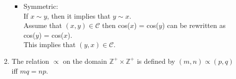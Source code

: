 \documentclass{article}
\newcommand{\Z}{\mathbb{Z}}
\begin{document}
\begin{enumerate}
\begin{enumerate}
\begin{itemize}
        \item Symmetric:\\If $x \sim y$, then it implies that $y \sim x$.\\Assume that $(x,y) \in 
        \mathcal{C}$ then cos($x$) = cos($y$) can be rewritten as cos($y$) = cos($x$).\\This implies 
        that $(y,x) \in \mathcal{C}$. 

        
    \end{itemize}
    \item The relation $\varpropto$ on the domain $\Z^+\times\Z^+$ is defined by $(m,n) \varpropto (p,q)$ iff $mq = np$.
\end{enumerate}

\end{enumerate}
\end{document}
